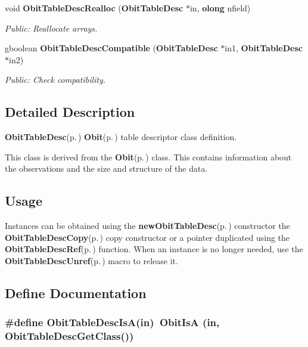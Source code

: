 \begin{CompactItemize}
void {\bf Obit\-Table\-Desc\-Realloc} ({\bf Obit\-Table\-Desc} $\ast$in, {\bf olong} nfield)
\begin{CompactList}\small\item\em Public: Reallocate arrays. \item\end{CompactList}\item 
gboolean {\bf Obit\-Table\-Desc\-Compatible} ({\bf Obit\-Table\-Desc} $\ast$in1, {\bf Obit\-Table\-Desc} $\ast$in2)
\begin{CompactList}\small\item\em Public: Check compatibility. \item\end{CompactList}\end{CompactItemize}


\subsection{Detailed Description}
{\bf Obit\-Table\-Desc}{\rm (p.\,\pageref{structObitTableDesc})} {\bf Obit}{\rm (p.\,\pageref{structObit})} table descriptor class definition. 

This class is derived from the {\bf Obit}{\rm (p.\,\pageref{structObit})} class. This contains information about the observations and the size and structure of the data.\subsection{Usage}\label{ObitTableDesc_8h_ObitTableDescUsage}
Instances can be obtained using the {\bf new\-Obit\-Table\-Desc}{\rm (p.\,\pageref{ObitTableDesc_8c_a4})} constructor the {\bf Obit\-Table\-Desc\-Copy}{\rm (p.\,\pageref{ObitTableDesc_8c_a6})} copy constructor or a pointer duplicated using the {\bf Obit\-Table\-Desc\-Ref}{\rm (p.\,\pageref{ObitTableDesc_8h_a1})} function. When an instance is no longer needed, use the {\bf Obit\-Table\-Desc\-Unref}{\rm (p.\,\pageref{ObitTableDesc_8h_a0})} macro to release it.

\subsection{Define Documentation}
\subsubsection{\setlength{\rightskip}{0pt plus 5cm}\#define Obit\-Table\-Desc\-Is\-A(in)\ Obit\-Is\-A (in, Obit\-Table\-Desc\-Get\-Class())}\label{ObitTableDesc_8h_a2}


